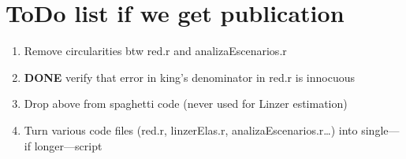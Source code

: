 \documentclass{article}
\begin{document}
\section{ToDo list if we get publication}
\label{sec:orgheadline46}
\begin{enumerate}
\item Remove circularities btw red.r and analizaEscenarios.r
\label{sec:orgheadline42}
\item {\bfseries\sffamily DONE} verify that error in king's denominator in red.r is innocuous
\label{sec:orgheadline43}
\item Drop above from spaghetti code (never used for Linzer estimation)
\label{sec:orgheadline44}

\item Turn various code files (red.r, linzerElas.r, analizaEscenarios.r\ldots{}) into single---if longer---script
\label{sec:orgheadline45}
\end{enumerate}
\end{document}
